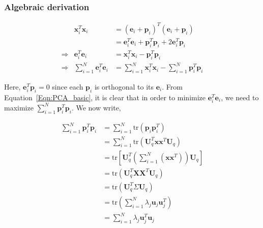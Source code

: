 \subsubsection{Algebraic derivation}
\begin{equation}
\begin{array}{lllll}
&\mathbf{x}_i^T\mathbf{x}_i 										&= (\mathbf{e}_i + \mathbf{p}_i)^T(\mathbf{e}_i + \mathbf{p}_i) \\
&																		&=	\mathbf{e}_i^T\mathbf{e}_i + \mathbf{p}_i^T\mathbf{p}_i + 2\mathbf{e}_i^T\mathbf{p}_i\\
\Rightarrow&\mathbf{e}_i^T\mathbf{e}_i							&=	\mathbf{x}_i^T\mathbf{x}_i - \mathbf{p}_i^T\mathbf{p}_i\\
\Rightarrow&\sum\limits_{i=1}^N\mathbf{e}_i^T\mathbf{e}_i	&=	\sum\limits_{i=1}^N\mathbf{x}_i^T\mathbf{x}_i - \sum\limits_{i=1}^N\mathbf{p}_i^T\mathbf{p}_i
\end{array}
\label{Eqn:PCA_basic}
\end{equation}

Here, $\mathbf{e}_i^T\mathbf{p}_i=0$ since each $\mathbf{p}_i$ is orthogonal to its $\mathbf{e}_i$.  From Equation~\ref{Eqn:PCA_basic}, it is clear that in order to minimize $\mathbf{e}_i^T\mathbf{e}_i$, we need to maximize $\sum\limits_{i=1}^{N}\mathbf{p}_i^T\mathbf{p}_i$.  We now write,

\begin{equation}
\begin{array}{ll}
\sum\limits_{i=1}^N \mathbf{p}_i^T\mathbf{p}_i 				&= \sum\limits_{i=1}^N \mbox{tr}(\mathbf{p}_i\mathbf{p}_i^T)\\
				&= \sum\limits_{i=1}^N \mbox{tr}(\mathbf{U}_q^T\mathbf{x}\mathbf{x}^T\mathbf{U}_q)\\
				&= \mbox{tr} \left[ \mathbf{U}_q^T \left(\sum\limits_{i=1}^N (\mathbf{x}\mathbf{x}^T)\right) \mathbf{U}_q \right]\\
				&= \mbox{tr} (\mathbf{U}_q^T\mathbf{X}\mathbf{X}^T\mathbf{U}_q)\\
				&= \mbox{tr} (\mathbf{U}_q^T\Sigma \mathbf{U}_q)\\
				&= \mbox{tr} (\sum\limits_{i=1}^N \lambda_j \mathbf{u}_j \mathbf{u}_j^T)\\
				&= \sum\limits_{i=1}^N \lambda_j \mathbf{u}_j^T \mathbf{u}_j\\
\end{array}
\end{equation}


